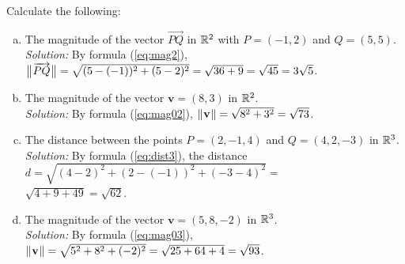 \newpage
\begin{exmp}
 Calculate the following:
 \begin{enumerate}[(a)]
  \item The magnitude of the vector $\overrightarrow{PQ}$ in $\mathbb{R}^{2}$ with $P = (-1,2)$ and
   $Q = (5,5)$.\\\emph{Solution:} By formula (\ref{eq:mag2}), $\bigl\lVert\mspace{1mu}\overrightarrow{PQ}\mspace{1mu}\bigr\rVert =
   \sqrt{(5 - (-1))^2 + (5 - 2)^2} = \sqrt{36 + 9} = \sqrt{45} = 3 \sqrt{5}$.
  \item The magnitude of the vector $\textbf{v} = (8,3)$ in $\mathbb{R}^{2}$.\\\emph{Solution:} By formula
   (\ref{eq:mag02}), $\lVert\mspace{1mu}\textbf{v}\mspace{1mu}\rVert = \sqrt{8^2 + 3^2} = \sqrt{73}$.
  \item The distance between the points $P = (2, -1, 4)$ and $Q = (4, 2, -3)$ in $\mathbb{R}^{3}$.\\\emph{Solution:}
   By formula (\ref{eq:dist3}), the distance $d = \sqrt{(4 - 2)^2 + (2 - (-1))^2 + (-3 - 4)^2} =$\\$\sqrt{4 + 9 + 49} =
   \sqrt{62}$.
  \item The magnitude of the vector $\textbf{v} = (5,8,-2)$ in $\mathbb{R}^{3}$.\\\emph{Solution:} By formula
   (\ref{eq:mag03}), $\lVert\mspace{1mu}\textbf{v}\mspace{1mu}\rVert = \sqrt{5^2 + 8^2 + (-2)^2} = \sqrt{25 + 64 + 4} = \sqrt{93}$.\vspace{-4mm}
 \end{enumerate}
\end{exmp}
\startexercises\label{sec1dot1}

